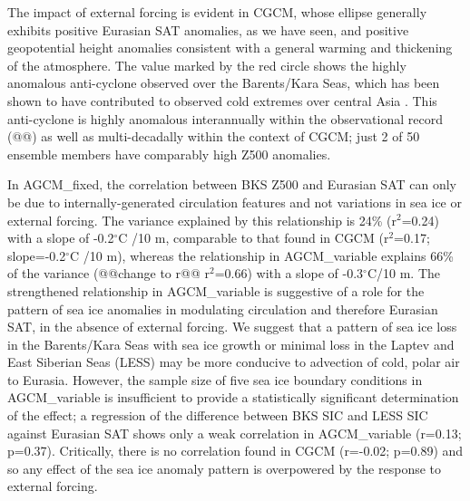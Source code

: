 \documentclass{nature}
\begin{document}
The impact of external forcing is evident in CGCM, whose ellipse generally exhibits positive Eurasian SAT anomalies, as we have seen, and positive geopotential height anomalies consistent with a general warming and thickening of the atmosphere. The value marked by the red circle shows the highly anomalous anti-cyclone observed over the Barents/Kara Seas, which has been shown to have contributed to observed cold extremes over central Asia \cite{horton15}. This anti-cyclone is highly anomalous interannually within the observational record (@@\cite{horton15}) as well as multi-decadally within the context of CGCM; just 2 of 50 ensemble members have comparably high Z500 anomalies.


In AGCM\_fixed, the correlation between BKS Z500 and Eurasian SAT can only be due to internally-generated circulation features and not variations in sea ice or external forcing. The variance explained by this relationship is 24\% (r$^2$=0.24) with a slope of -0.2$^\circ$C /10 m, comparable to that found in CGCM (r$^2$=0.17; slope=-0.2$^\circ$C /10 m), whereas the relationship in AGCM\_variable explains 66\% of the variance (@@change to r@@ r$^2$=0.66) with a slope of -0.3$^\circ$C/10 m. The strengthened relationship in AGCM\_variable is suggestive of a role for the pattern of sea ice anomalies in modulating circulation and therefore Eurasian SAT, in the absence of external forcing. We suggest that a pattern of sea ice loss in the Barents/Kara Seas with sea ice growth or minimal loss in the Laptev and East Siberian Seas (LESS) may be more conducive to advection of cold, polar air to Eurasia. However, the sample size of five sea ice boundary conditions in AGCM\_variable is insufficient to provide a statistically significant determination of the effect; a regression of the difference between BKS SIC and LESS SIC against Eurasian SAT shows only a weak correlation in AGCM\_variable (r=0.13; p=0.37). Critically, there is no correlation found in CGCM (r=-0.02; p=0.89) and so any effect of the sea ice anomaly pattern is overpowered by the response to external forcing.  %
\end{document}
